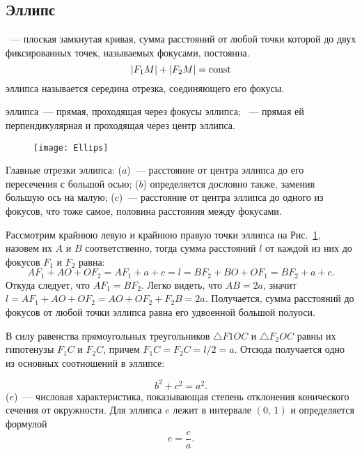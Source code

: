 \subsection{Эллипс}

{\bfseries {}}~--- плоская замкнутая кривая, сумма расстояний от любой точки которой до двух фиксированных точек, называемых фокусами, постоянна.
\begin{equation}
	|F_1 M| + |F_2 M|=\operatorname{const} \label{eq:ell-def}
\end{equation}
 эллипса называется середина отрезка, соединяющего его фокусы.

 эллипса~--- прямая, проходящая через фокусы эллипса; ~--- прямая ей перпендикулярная и проходящая через центр эллипса.

\begin{wrapfigure}[10]{r}{0.5\tw}
	\texttt{[image: Ellips]}
	\label{pic:ellipse}
\end{wrapfigure}
Главные отрезки эллипса:  ($a$)~--- расстояние от центра эллипса до его пересечения с большой осью;  ($b$) определяется дословно также, заменив большую ось на малую;  ($c$)~--- расстояние от центра эллипса до одного из фокусов, что тоже самое, половина расстояния между фокусами.

Рассмотрим крайнюю левую и крайнюю правую точки эллипса на Рис.~\ref{pic:ellipse}, назовем их $A$ и $B$ соответственно, тогда сумма расстояний $l$ от каждой из них до фокусов $F_1$ и $F_2$ равна:
\begin{equation*}
	AF_1 + AO + OF_2 = AF_1 + a + c = l = BF_2 + BO + OF_1 = BF_2 + a + c.
\end{equation*}
Откуда следует, что $A F_1 = B F_2$. Легко видеть, что $AB = 2a$, значит $l = AF_1 + AO + OF_2 = AO + OF_2 + F_2B = 2a$. Получается, сумма расстояний до фокусов от любой точки эллипса равна его удвоенной большой полуоси.

В силу равенства прямоугольных треугольников $\triangle F1 O C$ и $\triangle F_2 O C$ равны их гипотенузы $F_1C$ и $F_2C$, причем $F_1C= F_2C = l/2 = a$. Отсюда получается одно из основных соотношений в эллипсе:

\begin{equation}
	b^2 + c^2 = a^2.
\end{equation}
 ($e$)~--- числовая
характеристика, показывающая степень отклонения конического сечения от окружности. Для эллипса $e$ лежит в интервале $(0, \, 1)$ и
определяется формулой
\begin{equation}
	e = \frac{c}{a}.
\end{equation}


